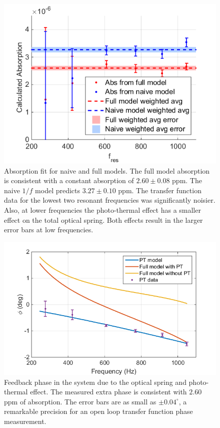 \begin{figure}[htb]%
\includegraphics[width=\columnwidth]{figures/photothermal/newABS.png}%
\caption[Absorption fit for naive and full models]{Absorption fit for naive and full models. The full model absorption is consistent with a constant absorption of  $2.60\pm0.08$ ppm. The naive $1/f$ model predicts $3.27\pm0.10$ ppm. The transfer function data for the lowest two resonant frequencies was significantly noisier. Also, at lower frequencies the photo-thermal  effect has a smaller effect on the total optical spring. Both effects result in the larger error bars at low frequencies.}
\label{fig:abs}%
\end{figure}

\begin{figure}[htb]%
\includegraphics[width=\columnwidth]{figures/photothermal/newPhi.png}%
\caption[Feedback phase in the system]{Feedback phase in the system due to the optical spring and photo-thermal effect. The measured extra phase is consistent with $2.60$ ppm of absorption. The error bars are as small as $\pm 0.04^{\circ}$, a remarkable precision for an open loop transfer function phase measurement.
}
\label{fig:phi}%
\end{figure}

